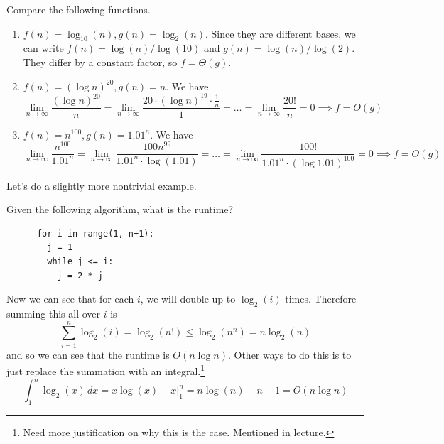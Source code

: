 \documentclass{article}
\begin{document}
  \begin{example}
    Compare the following functions. 
    \begin{enumerate}
      \item $f(n) = \log_{10} (n), g(n) = \log_2 (n)$. Since they are different bases, we can write $f(n) = \log (n) / \log (10)$ and $g(n) = \log(n) / \log(2)$. They differ by a constant factor, so $f = \Theta(g)$. 

      \item $f(n) = (\log n)^{20}, g(n) = n$. We have 
      \begin{equation}
        \lim_{n \rightarrow \infty} \frac{(\log n)^20}{n} = \lim_{n \rightarrow \infty} \frac{20 \cdot (\log n)^{19} \cdot \frac{1}{n}}{1} = \ldots = \lim_{n \rightarrow \infty} \frac{20!}{n} = 0 \implies f = O(g)
      \end{equation}

      \item $f(n) = n^{100}, g(n) = 1.01^n$. We have 
        \begin{equation}
          \lim_{n \rightarrow \infty} \frac{n^{100}}{1.01^n} = \lim_{n \rightarrow \infty} \frac{100 n^{99}}{1.01^n \cdot \log (1.01)} =  \ldots = \lim_{n \rightarrow \infty} \frac{100!}{1.01^n \cdot (\log 1.01)^100} = 0 \implies f = O(g)
        \end{equation}
    \end{enumerate}
  \end{example}

  Let's do a slightly more nontrivial example. 

  \begin{example}
    Given the following algorithm, what is the runtime? 
    \begin{lstlisting}
      for i in range(1, n+1): 
        j = 1 
        while j <= i: 
          j = 2 * j
    \end{lstlisting}
    Now we can see that for each $i$, we will double up to $\log_2 (i)$ times. Therefore summing this all over $i$ is 
    \begin{equation}
      \sum_{i = 1}^n \log_2 (i) = \log_2 (n!) \leq \log_2 (n^n) = n \log_2 (n)
    \end{equation}
    and so we can see that the runtime is $O(n \log n)$. Other ways to do this is to just replace the summation with an integral.\footnote{Need more justification on why this is the case. Mentioned in lecture.} 
    \begin{equation}
      \int_1^n \log_2 (x) \,dx = x \log(x) - x \big|_1^n = n \log(n) - n + 1 = O(n \log n)
    \end{equation}
  \end{example}
\end{document}
